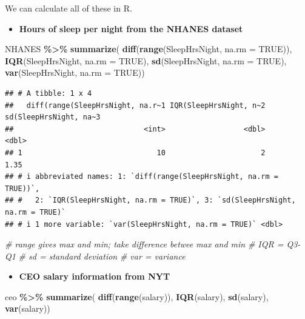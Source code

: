 \documentclass[
]{book}
\newenvironment{Shaded}{\begin{snugshade}}{\end{snugshade}}
\newcommand{\AttributeTok}[1]{\textcolor[rgb]{0.13,0.29,0.53}{#1}}
\newcommand{\CommentTok}[1]{\textcolor[rgb]{0.56,0.35,0.01}{\textit{#1}}}
\newcommand{\ConstantTok}[1]{\textcolor[rgb]{0.56,0.35,0.01}{#1}}
\newcommand{\FunctionTok}[1]{\textcolor[rgb]{0.13,0.29,0.53}{\textbf{#1}}}
\newcommand{\NormalTok}[1]{#1}
\newcommand{\SpecialCharTok}[1]{\textcolor[rgb]{0.81,0.36,0.00}{\textbf{#1}}}
\providecommand{\tightlist}{%
  \setlength{\itemsep}{0pt}\setlength{\parskip}{0pt}}
\begin{document}
We can calculate all of these in R.

\begin{itemize}
\tightlist
\item
  \textbf{Hours of sleep per night from the NHANES dataset}
\end{itemize}

\begin{Shaded}
\begin{Highlighting}[]
\NormalTok{NHANES }\SpecialCharTok{\%\textgreater{}\%}
  \FunctionTok{summarize}\NormalTok{(}
    \FunctionTok{diff}\NormalTok{(}\FunctionTok{range}\NormalTok{(SleepHrsNight, }\AttributeTok{na.rm =} \ConstantTok{TRUE}\NormalTok{)), }
    \FunctionTok{IQR}\NormalTok{(SleepHrsNight, }\AttributeTok{na.rm =} \ConstantTok{TRUE}\NormalTok{), }
    \FunctionTok{sd}\NormalTok{(SleepHrsNight, }\AttributeTok{na.rm =} \ConstantTok{TRUE}\NormalTok{), }
    \FunctionTok{var}\NormalTok{(SleepHrsNight, }\AttributeTok{na.rm =} \ConstantTok{TRUE}\NormalTok{))}
\end{Highlighting}
\end{Shaded}

\begin{verbatim}
## # A tibble: 1 x 4
##   diff(range(SleepHrsNight, na.r~1 IQR(SleepHrsNight, n~2 sd(SleepHrsNight, na~3
##                              <int>                  <dbl>                  <dbl>
## 1                               10                      2                   1.35
## # i abbreviated names: 1: `diff(range(SleepHrsNight, na.rm = TRUE))`,
## #   2: `IQR(SleepHrsNight, na.rm = TRUE)`, 3: `sd(SleepHrsNight, na.rm = TRUE)`
## # i 1 more variable: `var(SleepHrsNight, na.rm = TRUE)` <dbl>
\end{verbatim}

\begin{Shaded}
\begin{Highlighting}[]
\CommentTok{\# range gives max and min; take difference betwee max and min}
\CommentTok{\# IQR = Q3{-}Q1}
\CommentTok{\# sd = standard deviation}
\CommentTok{\# var = variance}
\end{Highlighting}
\end{Shaded}

\begin{itemize}
\tightlist
\item
  \textbf{CEO salary information from NYT}
\end{itemize}

\begin{Shaded}
\begin{Highlighting}[]
\NormalTok{ceo }\SpecialCharTok{\%\textgreater{}\%}
  \FunctionTok{summarize}\NormalTok{(}
    \FunctionTok{diff}\NormalTok{(}\FunctionTok{range}\NormalTok{(salary)), }
    \FunctionTok{IQR}\NormalTok{(salary), }
    \FunctionTok{sd}\NormalTok{(salary), }
    \FunctionTok{var}\NormalTok{(salary))}
\end{Highlighting}
\end{Shaded}
\end{document}
